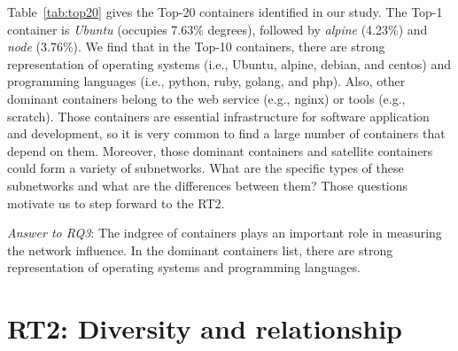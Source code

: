\documentclass[sigconf]{acmart}
\begin{document}
Table~\ref{tab:top20} gives the Top-20 containers identified in our study. The Top-1 container is \emph{Ubuntu} (occupies 7.63\% degrees), followed by \emph{alpine} (4.23\%) and \emph{node} (3.76\%). 
We find that in the Top-10 containers, there are strong representation of operating systems (i.e., Ubuntu, alpine, debian, and centos) and programming languages (i.e., python, ruby, golang, and php). 
Also, other dominant containers belong to the web service (e.g., nginx) or tools (e.g., scratch). 
Those containers are essential infrastructure for software application and development, so it is very common to find a large number of containers that depend on them. 
Moreover, those dominant containers and satellite containers could form a variety of subnetworks. 
What are the specific types of these subnetworks and what are the differences between them? Those questions motivate us to step forward to the RT2. 






\begin{mybox}
\emph{Answer to RQ3}: 
The indgree of containers plays an important role in measuring the network influence. 
In the dominant containers list, there are strong representation of operating systems and programming languages. 
\end{mybox}


\section{RT2: Diversity and relationship}
\label{sec:rt2}
\end{document}
